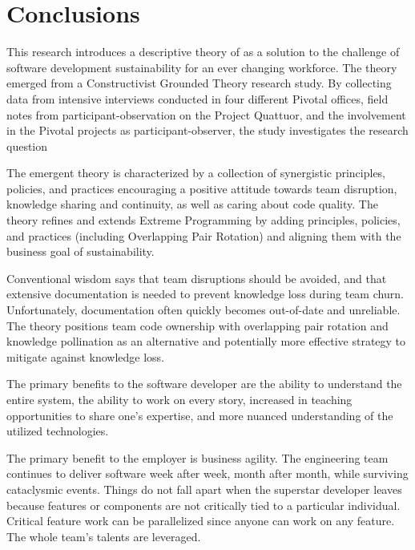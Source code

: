 \section{Conclusions}
This research introduces a descriptive theory of  as a solution to the challenge of software development sustainability for an ever changing workforce. The theory emerged from a Constructivist Grounded Theory research study. By collecting data from \numberOfInterviews{} intensive interviews conducted in four different Pivotal offices, field notes from participant-observation on the Project Quattuor, and the involvement in the \numberOfObservedProjects{} Pivotal projects as participant-observer, the study investigates the research question 

The emergent theory is characterized by a collection of synergistic principles, policies, and practices encouraging a positive attitude towards team disruption, knowledge sharing and continuity, as well as caring about code quality. The theory refines and extends Extreme Programming by adding principles, policies, and practices (including Overlapping Pair Rotation) and aligning them with the business goal of sustainability.

Conventional wisdom says that team disruptions should be avoided, and that extensive documentation is needed to prevent knowledge loss during team churn. Unfortunately, documentation often quickly becomes out-of-date and unreliable. The theory positions team code ownership with overlapping pair rotation and knowledge pollination as an alternative and potentially more effective strategy to mitigate against knowledge loss.

The primary benefits to the software developer are the ability to understand the entire system, the ability to work on every story, increased in teaching opportunities to share one's expertise, and more nuanced understanding of the utilized technologies. 

The primary benefit to the employer is business agility. The engineering team continues to deliver software week after week, month after month, while surviving cataclysmic events. Things do not fall apart when the superstar developer leaves because features or components are not critically tied to a particular individual. Critical feature work can be parallelized since anyone can work on any feature.  The whole team's talents are leveraged.


